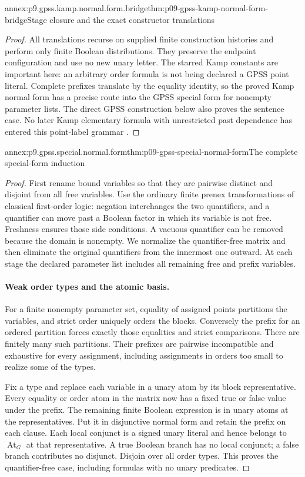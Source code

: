 \begin{annexitem}{annex:p9.gpss.kamp.normal.form.bridge}{thm:p09-gpss-kamp-normal-form-bridge}{Stage closure and the exact constructor translations}
\begin{proof}
All translations recurse on supplied finite construction
histories and perform only finite Boolean distributions.
They preserve the endpoint configuration and use no new
unary letter. The starred Kamp constants are important here:
an arbitrary order formula is not being declared a GPSS
point literal. Complete prefixes translate by the equality
identity, so the proved Kamp normal form has a precise route
into the GPSS special form for nonempty parameter lists.
The direct GPSS construction below also proves the sentence
case. No later Kamp elementary formula with unrestricted
past dependence has entered this point-label grammar
\cite[ch.~III, pp.~43--56]{Kamp1968}
\cite[p.~170]{GabbayPnueliShelahStavi1980}.
\end{proof}
\end{annexitem}

\begin{annexitem}{annex:p9.gpss.special.normal.form}{thm:p09-gpss-special-normal-form}{The complete special-form induction}
\begin{proof}
First rename bound variables so that they are pairwise distinct
and disjoint from all free variables. Use the ordinary finite
prenex transformations of classical first-order logic: negation
interchanges the two quantifiers, and a quantifier can move past
a Boolean factor in which its variable is not free. Freshness
ensures those side conditions. A vacuous quantifier can be
removed because the domain is nonempty. We normalize the
quantifier-free matrix and then eliminate the original quantifiers
from the innermost one outward. At each stage the declared
parameter list includes all remaining free and prefix variables.

\paragraph{Weak order types and the atomic basis.}
For a finite nonempty parameter set, equality of assigned points
partitions the variables, and strict order uniquely orders the
blocks. Conversely the prefix for an ordered partition forces
exactly those equalities and strict comparisons. There are finitely
many such partitions. Their prefixes are pairwise incompatible
and exhaustive for every assignment, including assignments in
orders too small to realize some of the types.

Fix a type and replace each variable in a unary atom by its
block representative. Every equality or order atom in the
matrix now has a fixed true or false value under the prefix.
The remaining finite Boolean expression is in unary atoms
at the representatives. Put it in disjunctive normal form
and retain the prefix on each clause. Each local conjunct
is a signed unary literal and hence belongs to
\(\operatorname{At}_G\) at that representative. A true
Boolean branch has no local conjunct; a false branch contributes
no disjunct. Disjoin over all order types. This proves the
quantifier-free case, including formulas with no unary predicates.


\end{proof}
\end{annexitem}
